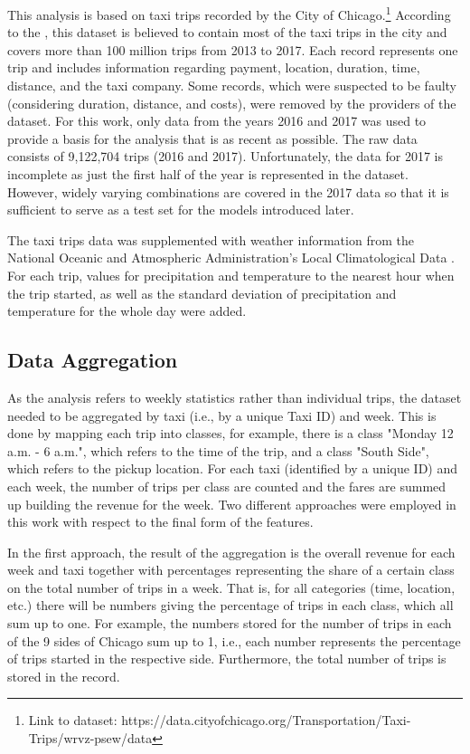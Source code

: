 \documentclass[twoside,11pt]{article}
\begin{document}
This analysis is based on taxi trips recorded by the City of Chicago.\footnote{Link to dataset: https://data.cityofchicago.org/Transportation/Taxi-Trips/wrvz-psew/data} According to the \citet{dataDesc}, this dataset is believed to contain most of the taxi trips in the city and covers more than 100 million trips from 2013 to 2017. Each record represents one trip and includes information regarding payment, location, duration, time, distance, and the taxi company. Some records, which were suspected to be faulty (considering duration, distance, and costs), were removed by the providers of the dataset. For this work, only data from the years 2016 and 2017 was used to provide a basis for the analysis that is as recent as possible. The raw data consists of 9,122,704 trips (2016 and 2017). Unfortunately, the data for 2017 is incomplete as just the first half of the year is represented in the dataset. However, widely varying combinations are covered in the 2017 data so that it is sufficient to serve as a test set for the models introduced later.\par

The taxi trips data was supplemented with weather information from the National Oceanic and Atmospheric Administration’s Local Climatological Data \citep{NOAA}. For each trip, values for precipitation and temperature to the nearest hour when the trip started, as well as the standard deviation of precipitation and temperature for the whole day were added.

\subsection{Data Aggregation} \label{sec:aggregation}

As the analysis refers to weekly statistics rather than individual trips, the dataset needed to be aggregated by taxi (i.e., by a unique Taxi ID) and week. This is done by mapping each trip into classes, for example, there is a class "Monday 12 a.m. - 6 a.m.", which refers to the time of the trip, and a class "South Side", which refers to the pickup location. For each taxi (identified by a unique ID) and each week, the number of trips per class are counted and the fares are summed up building the revenue for the week. Two different approaches were employed in this work with respect to the final form of the features.\par

 In the first approach, the result of the aggregation is the overall revenue for each week and taxi together with percentages representing the share of a certain class on the total number of trips in a week. That is, for all categories (time, location, etc.) there will be numbers giving the percentage of trips in each class, which all sum up to one. For example, the numbers stored for the number of trips in each of the 9 sides of Chicago sum up to 1, i.e., each number represents the percentage of trips started in the respective side. Furthermore, the total number of trips is stored in the record.\par
\end{document}
